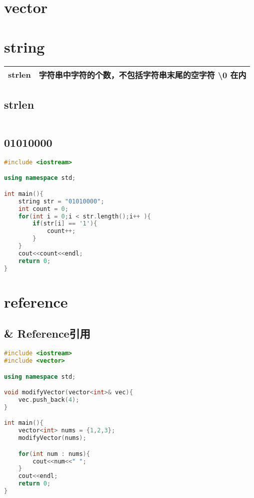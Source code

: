 \documentclass[12pt,twiside,a4paper]{ctexbook}
\numberwithin{chapter}{part}
\begin{document}
\chapter{vector}

\chapter{string}
\begin{tabular}{|p{8cm}|p{8cm}|}
\hline
strlen & 字符串中字符的个数，不包括字符串末尾的空字符 \textbackslash0 在内\\
\hline
\end{tabular}

\section{strlen}
\begin{lstlisting}[language=C++]

\end{lstlisting}

\section{01010000}
\begin{lstlisting}[language=C++]
#include <iostream>

using namespace std;

int main(){
	string str = "01010000";
	int count = 0;
	for(int i = 0;i < str.length();i++ ){
		if(str[i] == '1'){
			count++;
		}
	}
	cout<<count<<endl;
	return 0;
}
\end{lstlisting}

\chapter{reference}
\section{\& Reference引用}
\begin{lstlisting}[language=C++]
#include <iostream>
#include <vector>

using namespace std;

void modifyVector(vector<int>& vec){
	vec.push_back(4);
}

int main(){
	vector<int> nums = {1,2,3};
	modifyVector(nums);

	for(int num : nums){
		cout<<num<<" ";
	}
	cout<<endl;
	return 0;
}
\end{lstlisting}
\end{document}

